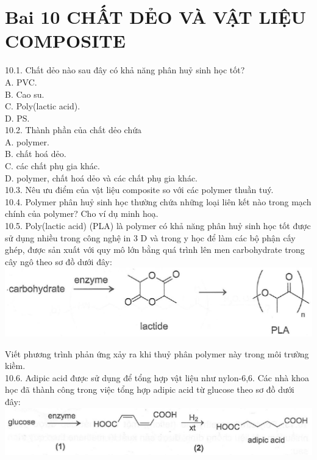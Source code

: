 \documentclass[10pt]{article}
\begin{document}
\section*{Bai 10 CHẤT DẺO VÀ VẬT LIỆU COMPOSITE}
10.1. Chất dẻo nào sau đây có khả năng phân huỷ sinh học tốt?\\
A. PVC.\\
B. Cao su.\\
C. Poly(lactic acid).\\
D. PS.\\
10.2. Thành phần của chất dẻo chứa\\
A. polymer.\\
B. chất hoá dẻo.\\
C. các chất phụ gia khác.\\
D. polymer, chất hoá dẻo và các chất phụ gia khác.\\
10.3. Nêu ưu điểm của vật liệu composite so với các polymer thuần tuý.\\
10.4. Polymer phân huỷ sinh học thường chứa những loại liên kết nào trong mạch chính của polymer? Cho ví dụ minh hoạ.\\
10.5. Poly(lactic acid) (PLA) là polymer có khả năng phân huỷ sinh học tốt được sử dụng nhiều trong công nghệ in 3 D và trong y học để làm các bộ phận cấy ghép, được sản xuất với quy mô lớn bằng quá trình lên men carbohydrate trong cây ngô theo sơ đồ dưới đây:\\
\includegraphics[max width=\textwidth, center]{2025_10_23_de6f5713836e4e91b3c8g-068}

Viết phương trình phản ứng xảy ra khi thuỷ phân polymer này trong môi trường kiềm.\\
10.6. Adipic acid được sử dụng để tổng hợp vật liệu như nylon-6,6. Các nhà khoa học đã thành công trong việc tổng hợp adipic acid từ glucose theo sơ đồ dưới đây:\\
\includegraphics[max width=\textwidth, center]{2025_10_23_de6f5713836e4e91b3c8g-069}
\end{document}
